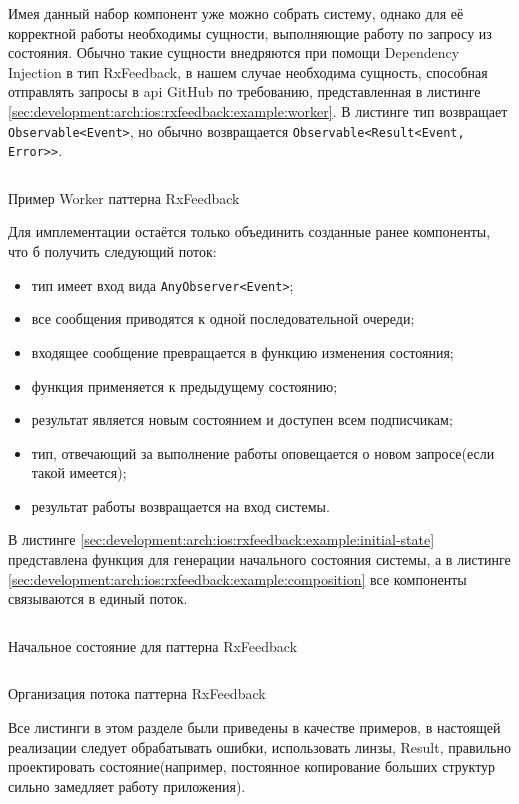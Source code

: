 Имея данный набор компонент уже можно собрать систему, однако для её корректной работы необходимы сущности, выполняющие работу по запросу из состояния. Обычно такие сущности внедряются при помощи Dependency Injection в тип RxFeedback, в нашем случае необходима сущность, способная отправлять запросы в \gls{api} GitHub по требованию, представленная в листинге \ref{sec:development:arch:ios:rxfeedback:example:worker}. В листинге тип возвращает \texttt{Observable<Event>}, но обычно возвращается \texttt{Observable<Result<Event, Error>>}.

\begin{code}
  \inputminted{swift}{inc/src/rx-feedback-worker.swift}
   \caption{Пример Worker паттерна RxFeedback}
   \label{sec:development:arch:ios:rxfeedback:example:worker}
\end{code}

Для имплементации остаётся только объединить созданные ранее компоненты, что б получить следующий поток:

\begin{itemize}
  \item тип имеет вход вида \texttt{AnyObserver<Event>};
  \item все сообщения приводятся к одной последовательной очереди;
  \item входящее сообщение превращается в функцию изменения состояния;
  \item функция применяется к предыдущему состоянию;
  \item результат является новым состоянием и доступен всем подписчикам;
  \item тип, отвечающий за выполнение работы оповещается о новом запросе(если такой имеется);
  \item результат работы возвращается на вход системы.
\end{itemize}

В листинге \ref{sec:development:arch:ios:rxfeedback:example:initial-state} представлена функция для генерации начального состояния системы, а в листинге \ref{sec:development:arch:ios:rxfeedback:example:composition} все компоненты связываются в единый поток.

\begin{code}
  \inputminted{swift}{inc/src/rx-feedback-initial-state.swift}
   \caption{Начальное состояние для паттерна RxFeedback}
   \label{sec:development:arch:ios:rxfeedback:example:initial-state}
\end{code}

\begin{code}
  \inputminted{swift}{inc/src/rx-feedback-composition.swift}
   \caption{Организация потока паттерна RxFeedback}
   \label{sec:development:arch:ios:rxfeedback:example:composition}
\end{code}

Все листинги в этом разделе были приведены в качестве примеров, в настоящей реализации следует обрабатывать ошибки, использовать линзы, Result, правильно проектировать состояние(например, постоянное копирование больших структур сильно замедляет работу приложения).

\clearpage